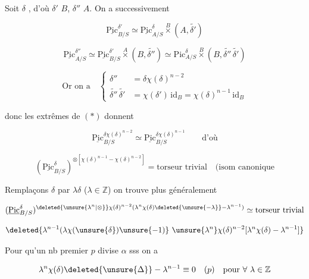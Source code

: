 
  Soit $\delta$   , d'où $\delta'$   $B$, $\delta''$   $A$. On a successivement

\[
\underline{\mathrm{Pic}}^{\delta'}_{B/S}\simeq\underline{\mathrm{Pic}}^\delta_{A/S}\overset B\times(A,\widetilde{\delta'})
\]

\[
\underline{\mathrm{Pic}}^{\delta''}_{A/S}\simeq\underline{\mathrm{Pic}}^{\delta'}_{B/S}\overset A\times(B,\widetilde{\delta''})\simeq\mathrm{Pic}^\delta_{A/S}\overset B\times(B,\widetilde{\delta''}\,\widetilde{\delta'})\tag*{(*)}
\]

\[
\text{Or on a}\quad\left\{\begin{aligned}
\delta''&=\delta\chi(\delta)^{n-2}\\
\widetilde{\delta''}\,\widetilde{\delta'}&=\chi(\delta')\,\mathrm{id}_B=\chi(\delta)^{n-1}\,\mathrm{id}_B
\end{aligned}\right.
\]

donc les  extrêmes de $(*)$ donnent

\[
\underline{\mathrm{Pic}}_{B/S}^{\delta\chi(\delta)^{n-2}}\simeq
\underline{\mathrm{Pic}}_{B/S}^{\delta\chi(\delta)^{n-1}}\qquad\text{d'où}
\]

\[
(\underline{\mathrm{Pic}}^\delta_{B/S})^{\otimes[\chi(\delta)^{n-1}-\chi(\delta)^{n-2}]}=\text{torseur trivial}\quad\text{(isom canonique}
\]

Remplaçons $\delta$ par $\lambda\delta$ ($\lambda\in\mathbb Z$) on trouve plus généralement

\[
(\underline{\mathrm{Pic}}^\delta_{B/S})^{\deleted{\unsure{\lambda^n|\otimes}}\chi(\delta)^{n-2}(\lambda^{n}\chi(\delta)\deleted{\unsure{-\lambda}}-\lambda^{n-1})}\simeq\text{torseur trivial}
\]

\[
\deleted{\lambda^{n-1}(\lambda\chi(\unsure{\delta})\unsure{-1)}\ \unsure{\lambda^n}\chi(\delta)^{n-2}[\lambda^n\chi(\delta)-\lambda^{n-1}]}
\]

 Pour qu'un nb premier $p$ divise $\alpha$ sss on a

\[
\lambda^n\chi(\delta)\deleted{\unsure{\Delta}}-\lambda^{n-1}\equiv0\quad(p)\quad\text{pour }\forall\ \lambda\in\mathbb Z
\]

